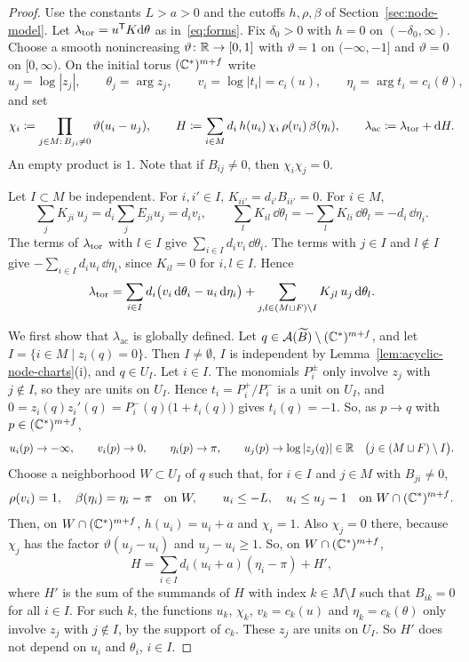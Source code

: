 \documentclass[12pt, letter]{amsart}
\theoremstyle{definition}
\begin{document}
\begin{proof}

Use the constants $L>a>0$ and the cutoffs $h,\rho,\beta$ of Section~\ref{sec:node-model}. Let \(\lambda_{\mathrm{tor}} = u^\mathsf T K \mathrm{d} \theta \) as in~\eqref{eq:forms}. 
Fix $\delta_0>0$ with $h=0$ on $(-\delta_0,\infty)$.
Choose a smooth nonincreasing $\vartheta\colon\mathbb{R}\to[0,1]$ with $\vartheta=1$ on $(-\infty,-1]$ and $\vartheta=0$ on $[0,\infty)$.
On the initial torus $(\mathbb{C}^*)^{m+f}$ write
\[
 u_j=\log|z_j|,\qquad \theta_j=\arg z_j,\qquad
 v_i=\log|t_i|=c_i(u),\qquad \eta_i=\arg t_i=c_i(\theta),
\]
and set
\[
 \chi_i \coloneqq \prod_{j\in M:\,B_{ji}\ne0}\vartheta(u_i-u_j),\qquad
 H \coloneqq \sum_{i\in M}d_i\,h(u_i)\,\chi_i\,\rho(v_i)\,\beta(\eta_i),\qquad
 \lambda_{\mathrm{ac}} \coloneqq\lambda_{\mathrm{tor}}+\mathrm{d} H .
\]
An empty product is $1$. Note that 
if $B_{ij}\ne0$, then $\chi_i\chi_j=0$.


Let $I\subset M$ be independent.
For $i,i'\in I$, $K_{ii'}=d_{i'}B_{ii'}=0$.
For $i\in M$,
\[
 \sum_{j}K_{ji}\,u_j=d_i\sum_jE_{ji}u_j=d_iv_i,\qquad
 \sum_lK_{il}\,\dd\theta_l=-\sum_lK_{li}\,\dd\theta_l=-d_i\,\dd\eta_i .
\]
The terms of $\lambda_{\mathrm{tor}}$ with $l\in I$ give $\sum_{i\in I}d_iv_i\,\dd\theta_i$.
The terms with $j\in I$ and $l\notin I$ give $-\sum_{i\in I}d_iu_i\,\dd\eta_i$, since $K_{il}=0$ for $i,l\in I$.
Hence
\begin{equation}\label{eq:acyclic-ltor-split}
 \lambda_{\mathrm{tor}}=\sum_{i\in I}d_i\bigl(v_i\,\mathrm{d}\theta_i-u_i\,\mathrm{d}\eta_i\bigr)+\sum_{j,l\in(M\sqcup F)\setminus I}K_{jl}\,u_j\,\mathrm{d}\theta_l .
\end{equation}

We first show that $\lambda_{\mathrm{ac}}$ is globally defined.
Let $q\in\mathcal{A}(\widetilde B)\setminus(\mathbb{C}^*)^{m+f}$, and let $I=\{i\in M\mid z_i(q)=0\}$.
Then $I\ne\emptyset$, $I$ is independent by Lemma~\ref{lem:acyclic-node-charts}(i), and $q\in U_I$.
Let $i\in I$.
The monomials $P_i^\pm$ only involve $z_j$ with $j\notin I$, so they are units on $U_I$.
Hence $t_i=P_i^+/P_i^-$ is a unit on $U_I$, and $0=z_i(q)z_i'(q)=P_i^-(q)\bigl(1+t_i(q)\bigr)$ gives $t_i(q)=-1$.
So, as $p\to q$ with $p\in(\mathbb{C}^*)^{m+f}$,
\[
 u_i(p)\to-\infty,\qquad v_i(p)\to0,\qquad \eta_i(p)\to\pi,\qquad u_j(p)\to\log|z_j(q)|\in\mathbb{R}\quad\bigl(j\in(M\sqcup F)\setminus I\bigr).
\]
Choose a neighborhood $W\subset U_I$ of $q$ such that, for $i\in I$ and $j\in M$ with $B_{ji}\ne0$,
\[
 \rho(v_i)=1,\quad \beta(\eta_i)=\eta_i-\pi\quad\text{on }W,\qquad
 u_i\le-L,\quad u_i\le u_j-1\quad\text{on }W\cap(\mathbb{C}^*)^{m+f}.
\]
Then, on $W\cap(\mathbb{C}^*)^{m+f}$, $h(u_i)=u_i+a$ and $\chi_i=1$.
Also $\chi_j=0$ there, because $\chi_j$ has the factor $\vartheta(u_j-u_i)$ and $u_j-u_i\ge1$.
So, on $W\cap(\mathbb{C}^*)^{m+f}$,
\begin{equation}\label{eq:acyclic-H-near}
 H=\sum_{i\in I}d_i(u_i+a)(\eta_i-\pi)+H',
\end{equation}
where $H'$ is the sum of the summands of $H$ with index $k\in M\setminus I$ such that $B_{ik}=0$ for all $i\in I$.
For such $k$, the functions $u_k$, $\chi_k$, $v_k=c_k(u)$ and $\eta_k=c_k(\theta)$ only involve $z_j$ with $j\notin I$, by the support of $c_k$.
These $z_j$ are units on $U_I$.
So $H'$ does not depend on $u_i$ and $\theta_i$, $i\in I$.


\end{proof}
\end{document}
